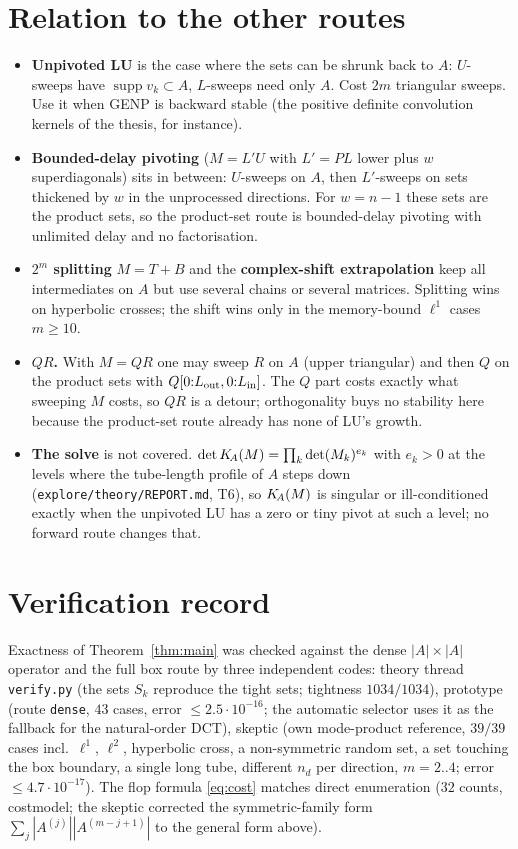 \documentclass[11pt]{article}
\DeclareMathOperator{\supp}{supp}
\begin{document}
\section{Relation to the other routes}\label{sec:rel}
\begin{itemize}
\item \textbf{Unpivoted LU} is the case where the sets can be shrunk back to $A$: $U$-sweeps have $\supp v_k\subset A$, $L$-sweeps
      need only $A$. Cost $2m$ triangular sweeps. Use it when GENP is backward stable (the positive definite convolution
      kernels of the thesis, for instance).
\item \textbf{Bounded-delay pivoting} ($M=L'U$ with $L'=PL$ lower plus $w$ superdiagonals) sits in between: $U$-sweeps on $A$,
      then $L'$-sweeps on sets thickened by $w$ in the unprocessed directions. For $w=n-1$ these sets are the product
      sets, so the product-set route is bounded-delay pivoting with unlimited delay and no factorisation.
\item \textbf{$2^m$ splitting} $M=T+B$ and the \textbf{complex-shift extrapolation} keep all intermediates on $A$ but use several
      chains or several matrices. Splitting wins on hyperbolic crosses; the shift wins only in the memory-bound
      $\ell^1$ cases $m\ge10$.
\item \textbf{$QR$.} With $M=QR$ one may sweep $R$ on $A$ (upper triangular) and then $Q$ on the product sets with
      $Q[0{:}L_{\rm out},0{:}L_{\rm in}]$. The $Q$ part costs exactly what sweeping $M$ costs, so $QR$ is a detour; orthogonality
      buys no stability here because the product-set route already has none of LU's growth.
\item \textbf{The solve} is not covered. $\det K_{\!A}(M)=\prod_k\det(M_k)^{e_k}$ with $e_k>0$ at the levels where the tube-length
      profile of $A$ steps down (\texttt{explore/theory/REPORT.md}, T6), so $K_{\!A}(M)$ is singular or ill-conditioned exactly
      when the unpivoted LU has a zero or tiny pivot at such a level; no forward route changes that.
\end{itemize}

\section{Verification record}
Exactness of Theorem~\ref{thm:main} was checked against the dense $|A|\times|A|$ operator and the full box route by three
independent codes: theory thread \texttt{verify.py} (the sets $S_k$ reproduce the tight sets; tightness $1034/1034$), prototype
(route \texttt{dense}, $43$ cases, error $\le2.5\cdot10^{-16}$; the automatic selector uses it as the fallback for the
natural-order DCT), skeptic (own mode-product reference, $39/39$ cases incl.\ $\ell^1$, $\ell^2$, hyperbolic cross, a
non-symmetric random set, a set touching the box boundary, a single long tube, different $n_d$ per direction,
$m=2..4$; error $\le4.7\cdot10^{-17}$). The flop formula \eqref{eq:cost} matches direct enumeration ($32$ counts, costmodel;
the skeptic corrected the symmetric-family form $\sum_j|A^{(j)}||A^{(m-j+1)}|$ to the general form above).
\end{document}
